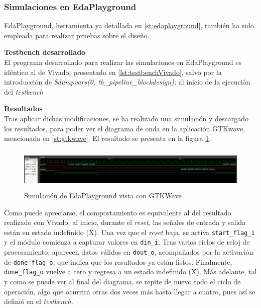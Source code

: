 \subsubsection{Simulaciones en EdaPlayground}
EdaPlayground, herramienta ya detallada en \ref{st:edaplayground}, también ha sido empleada para realizar pruebas sobre el diseño. 

\vspace{0.4em} %

\begin{adjustwidth}{1.5cm}{}
\textbf{Testbench desarrollado} \vspace{0.25cm} \\
El programa desarrollado para realizar las simulaciones en EdaPlayground es idéntico al de Vivado, presentado en \ref{lst:testbenchVivado}, salvo por la introducción de \emph{\$dumpvars(0, tb\_pipeline\_blockdesign);} al inicio de la ejecución del \textit{testbench}
\end{adjustwidth}

\vspace{0.4em} %

\begin{adjustwidth}{1.5cm}{}
\textbf{Resultados} \vspace{0.25cm} \\
Tras aplicar dichas modificaciones, se ha realizado una simulación y descargado los resultados, para poder ver el diagrama de onda en la aplicación GTKwave, mencionada en \ref{st:gtkwave}. El resultado se presenta en la figura \ref{fig:simEdaPlayground}.

\begin{figure}[!ht]
  \centering
  \includegraphics[width=15cm, height=2cm]{figures/simEdaPlayground.png}
  \caption{Simulación de EdaPlayground vista con GTKWave}
  \label{fig:simEdaPlayground}
\end{figure}

Como puede apreciarse, el comportamiento es equivalente al del resultado realizado con Vivado; al inicio, durante el \textit{reset}, las señales de entrada y salida están en estado indefinido ($\mathrm{X}$). Una vez que el \textit{reset} baja, se activa \texttt{start\_flag\_i} y el módulo comienza a capturar valores en \texttt{din\_i}. Tras varios ciclos de reloj de procesamiento, aparecen datos válidos en \texttt{dout\_o}, acompañados por la activación de \texttt{done\_flag\_o}, que indica que los resultados ya están listos. Finalmente, \texttt{done\_flag\_o} vuelve a cero y regresa a un estado indefinido ($\mathrm{X}$). Más adelante, tal y como se puede ver al final del diagrama, se repite de nuevo todo el ciclo de operación, algo que ocurrirá otras dos veces más hasta llegar a cuatro, pues así se definió en el \textit{testbench}.
\end{adjustwidth}

